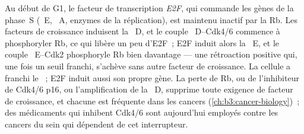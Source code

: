 \begin{proposition}\label{prop:b3:cell-cycle-apoptosis:rb}
Au début de G1, le facteur de transcription \emph{E2F}, qui commande
les gènes de la phase~S (~E, ~A, enzymes de la
réplication), est maintenu inactif par la \emph{} Rb. Les facteurs de croissance induisent la ~D,
et le couple ~D--Cdk4/6 commence à phosphoryler Rb, ce qui
libère un peu d'E2F~; E2F induit alors la ~E, et le couple
~E--Cdk2 phosphoryle Rb bien davantage --- une rétroaction
positive qui, une fois un seuil franchi, s'achève sans autre facteur de
croissance. La cellule a franchi le ~; E2F induit
aussi son propre gène. La perte de Rb, ou de l'inhibiteur de Cdk4/6
p16, ou l'amplification de la ~D, supprime toute exigence de
facteur de croissance, et chacune est fréquente dans les cancers
(\cref{ch:b3:cancer-biology})~; des médicaments qui inhibent Cdk4/6
sont aujourd'hui employés contre les cancers du sein qui dépendent de
cet interrupteur.
\end{proposition}

